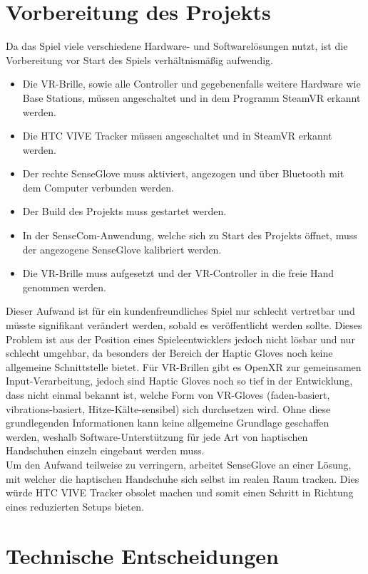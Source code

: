 \section{Vorbereitung des Projekts}
Da das Spiel viele verschiedene Hardware- und Softwarelösungen nutzt, ist die Vorbereitung vor Start des Spiels verhältnismäßig aufwendig.

\begin{itemize}
	\item Die VR-Brille, sowie alle Controller und gegebenenfalls weitere Hardware wie \dq Base Stations\dq, müssen angeschaltet und in dem Programm SteamVR erkannt werden.
	\item Die HTC VIVE Tracker müssen angeschaltet und in SteamVR erkannt werden.
	\item Der rechte SenseGlove muss aktiviert, angezogen und über Bluetooth mit dem Computer verbunden werden.
	\item Der Build des Projekts muss gestartet werden.
	\item In der SenseCom-Anwendung, welche sich zu Start des Projekts öffnet, muss der angezogene SenseGlove kalibriert werden.
	\item Die VR-Brille muss aufgesetzt und der VR-Controller in die freie Hand genommen werden.
\end{itemize}
\noindent Dieser Aufwand ist für ein kundenfreundliches Spiel nur schlecht vertretbar und müsste signifikant verändert werden, sobald es veröffentlicht werden sollte. Dieses Problem ist aus der Position eines Spieleentwicklers jedoch nicht lösbar und nur schlecht umgehbar, da besonders der Bereich der Haptic Gloves noch keine allgemeine Schnittstelle bietet. Für VR-Brillen gibt es OpenXR zur gemeinsamen Input-Verarbeitung, jedoch sind Haptic Gloves noch so tief in der Entwicklung, dass nicht einmal bekannt ist, welche Form von VR-Gloves (faden-basiert, vibrations-basiert, Hitze-Kälte-sensibel) sich durchsetzen wird. Ohne diese grundlegenden Infor\-mationen kann keine allgemeine Grundlage geschaffen werden, weshalb Software-Unterstützung für jede Art von haptischen Handschuhen einzeln eingebaut werden muss.\\
\noindent Um den Aufwand teilweise zu verringern, arbeitet SenseGlove an einer Lösung, mit welcher die haptischen Handschuhe sich selbst im realen Raum tracken. Dies würde HTC VIVE Tracker obsolet machen und somit einen Schritt in Richtung eines reduzierten Setups bieten.



\section{Technische Entscheidungen}

